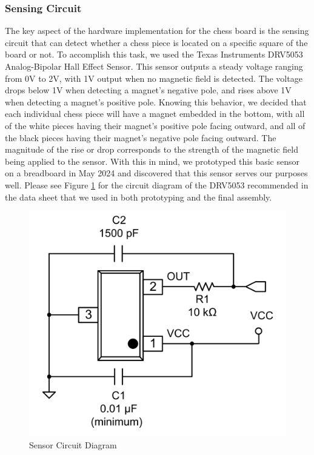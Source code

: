 \documentclass[11pt,journal]{IEEEtran}
\begin{document}
\subsubsection{Sensing Circuit}
The key aspect of the hardware implementation for the chess board is the sensing circuit that can detect whether a chess piece is located on a specific square of the board or not. To accomplish this task, we used the Texas Instruments DRV5053 Analog-Bipolar Hall Effect Sensor. This sensor outputs a steady voltage ranging from 0V to 2V, with 1V output when no magnetic field is detected. The voltage drops below 1V when detecting a magnet's negative pole, and rises above 1V when detecting a magnet's positive pole. Knowing this behavior, we decided that each individual chess piece will have a magnet embedded in the bottom, with all of the white pieces having their magnet's positive pole facing outward, and all of the black pieces having their magnet's negative pole facing outward. The magnitude of the rise or drop corresponds to the strength of the magnetic field being applied to the sensor. With this in mind, we prototyped this basic sensor on a breadboard in May 2024 and discovered that this sensor serves our purposes well. Please see Figure \ref{sensorcircuit} for the circuit diagram of the DRV5053 recommended in the data sheet that we used in both prototyping and the final assembly.
\begin{figure}[h]
  \includegraphics[width=\linewidth]{SensorCircuit.png}
  \caption{Sensor Circuit Diagram}
  \label{sensorcircuit}
\end{figure}
\end{document}
